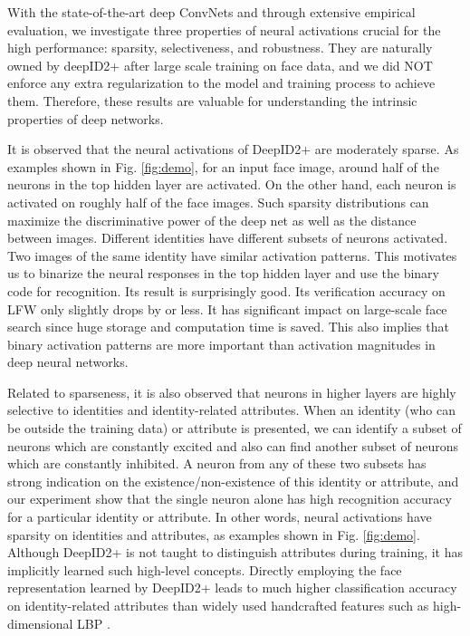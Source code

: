 \documentclass[10pt,twocolumn,letterpaper]{article}
\begin{document}
With the state-of-the-art deep ConvNets and through extensive empirical evaluation, we investigate three properties of  neural activations crucial for  the high performance: sparsity, selectiveness, and robustness. They are naturally owned by deepID2+ after large scale training on face data, and we did NOT enforce any extra regularization to the model and training process to achieve them. Therefore, these results are valuable for understanding the intrinsic properties of deep  networks.

It is observed that the neural activations of DeepID2+ are moderately sparse. As examples shown in Fig. \ref{fig:demo}, for an input face image, around half of the neurons in the top hidden layer are activated. On the other hand, each neuron is activated on roughly half of the face images. Such sparsity distributions can maximize the discriminative power of  the deep net as well as the distance between images. Different identities have different subsets of neurons activated. Two images of the same identity have similar activation patterns. This motivates us to binarize the neural responses in the top hidden layer and  use the binary code for  recognition. Its result is surprisingly good. Its verification accuracy on LFW only slightly drops by  or less. It has significant impact on large-scale face search since huge storage and computation time is saved. This also implies that binary activation patterns are more important than activation magnitudes in deep neural networks.

Related to sparseness, it is also observed that neurons in higher layers are highly selective to identities and identity-related attributes. When an identity (who can be outside the training data) or attribute is presented, we can identify a subset of neurons which are constantly excited and also can find another subset of neurons which are constantly inhibited. A neuron from any of these two subsets has strong indication on the existence/non-existence of this identity or attribute, and our experiment show that the single neuron alone has high recognition accuracy for a particular identity or attribute. In other words, neural activations have sparsity on identities and attributes, as examples shown in Fig. \ref{fig:demo}. Although  DeepID2+  is not taught to distinguish attributes during training, it has implicitly learned such high-level concepts. Directly employing the face representation learned by DeepID2+ leads to much higher classification accuracy on identity-related attributes than widely used handcrafted features such as high-dimensional LBP \cite{chen2013,cao2013}.
\end{document}
